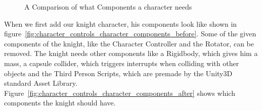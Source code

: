 \documentclass[12pt, a4paper, titlepage]{article}
\begin{document}
\begin{figure}[htbp]
  \begin{center}
    \hspace{0.5in}
  \end{center}
  \caption{A Comparison of what Components a character needs}
  \label{fig:character_controls_character_components}
\end{figure}

When we first add our knight character, his components look like shown in  figure~\ref{fig:character_controls_character_components_before}. Some of the given components of the knight, like the Character Controller and the Rotator, can be removed. The knight needs other components like a Rigidbody, which gives him a mass, a capsule collider, which triggers interrupts when colliding with other objects and the Third Person Scripts, which are premade by the Unity3D standard Asset Library. Figure~\ref{fig:character_controls_character_components_after} shows which components the knight should have.
\end{document}
